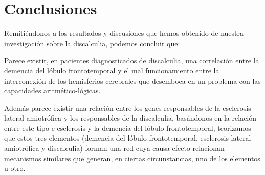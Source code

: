\section{Conclusiones}

\hfill

Remitiéndonos a los resultados y discusiones que hemos obtenido de nuestra investigación sobre la discalculia, podemos concluir que:

\hfill

Parece existir, en pacientes diagnosticados de discalculia, una correlación entre la demencia del lóbulo frontotemporal y el mal funcionamiento entre la interconexión de los hemisferios cerebrales que desemboca en un problema con las capacidades aritmético-lógicas.

\hfill

Además parece existir una relación entre los genes responsables de la esclerosis lateral amiotrófica y los responsables de la discalculia, basándonos en la relación entre este tipo e esclerosis y la demencia del lóbulo frontotemporal, teorizamos que estos tres elementos (demencia del lóbulo frontotemporal, esclerosis lateral amiotrófica y discalculia)  forman una red cuya causa-efecto relacionan mecanismos similares que generan, en ciertas circunstancias, uno de los elementos u otro.

